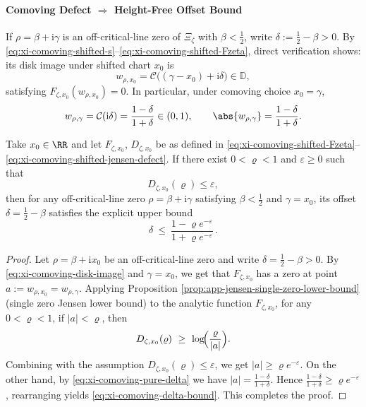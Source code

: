 \paragraph{Comoving Defect \texorpdfstring{$\Rightarrow$}{=>} Height-Free Offset Bound}
If \(\rho=\beta+\mathrm{i}\gamma\) is an off-critical-line zero of \(\Xi_{\zeta}\) with \(\beta<\tfrac12\), write \(\delta:=\tfrac12-\beta>0\).
By \eqref{eq:xi-comoving-shifted-s}--\eqref{eq:xi-comoving-shifted-Fzeta}, direct verification shows: its disk image under shifted chart \(x_0\) is
\begin{equation}\label{eq:xi-comoving-disk-image}
w_{\rho,x_0}=\mathcal{C}\bigl((\gamma-x_0)+\mathrm{i}\delta\bigr)\in\mathbb{D},
\end{equation}
satisfying \(F_{\zeta,x_0}(w_{\rho,x_0})=0\).
In particular, under comoving choice \(x_0=\gamma\),
\begin{equation}\label{eq:xi-comoving-pure-delta}
w_{\rho,\gamma}=\mathcal{C}(\mathrm{i}\delta)=\frac{1-\delta}{1+\delta}\in(0,1),
\qquad
\abs{w_{\rho,\gamma}}=\frac{1-\delta}{1+\delta}.
\end{equation}

\begin{theorem}\label{thm:xi-comoving-defect-implies-delta-bound}
Take \(x_0\in\RR\) and let \(F_{\zeta,x_0}\), \(D_{\zeta,x_0}\) be as defined in \eqref{eq:xi-comoving-shifted-Fzeta}--\eqref{eq:xi-comoving-shifted-jensen-defect}.
If there exist \(0<\varrho<1\) and \(\varepsilon\ge 0\) such that
\[
D_{\zeta,x_0}(\varrho)\le \varepsilon,
\]
then for any off-critical-line zero \(\rho=\beta+\mathrm{i}\gamma\) satisfying \(\beta<\tfrac12\) and \(\gamma=x_0\), its offset \(\delta=\tfrac12-\beta\) satisfies the explicit upper bound
\begin{equation}\label{eq:xi-comoving-delta-bound}
\boxed{\;
\delta\ \le\ \frac{1-\varrho e^{-\varepsilon}}{1+\varrho e^{-\varepsilon}}\,.
\;}
\end{equation}
\end{theorem}

\begin{proof}
Let \(\rho=\beta+\mathrm{i}x_0\) be an off-critical-line zero and write \(\delta=\tfrac12-\beta>0\).
By \eqref{eq:xi-comoving-disk-image} and \(\gamma=x_0\), we get that \(F_{\zeta,x_0}\) has a zero at point \(a:=w_{\rho,x_0}=w_{\rho,\gamma}\).
Applying Proposition \ref{prop:app-jensen-single-zero-lower-bound} (single zero Jensen lower bound) to the analytic function \(F_{\zeta,x_0}\), for any \(0<\varrho<1\), if \(|a|<\varrho\), then
\[
D_{\zeta,x_0}(\varrho)\ \ge\ \log\!\Bigl(\frac{\varrho}{|a|}\Bigr).
\]
Combining with the assumption \(D_{\zeta,x_0}(\varrho)\le\varepsilon\), we get \(|a|\ge \varrho e^{-\varepsilon}\).
On the other hand, by \eqref{eq:xi-comoving-pure-delta} we have \(|a|=\frac{1-\delta}{1+\delta}\).
Hence \(\frac{1-\delta}{1+\delta}\ge \varrho e^{-\varepsilon}\), rearranging yields \eqref{eq:xi-comoving-delta-bound}. This completes the proof.
\end{proof}

